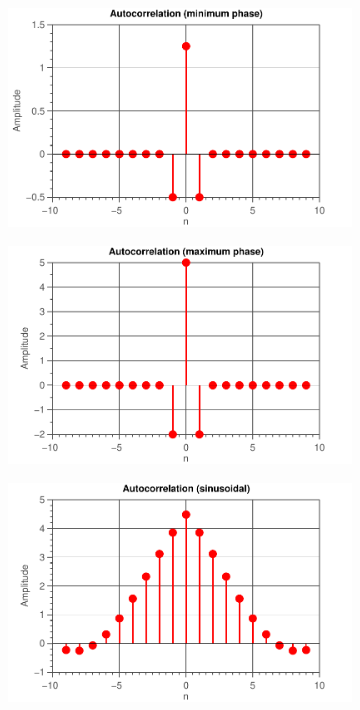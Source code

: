 \documentclass[11pt,titlepage]{report}
\begin{document}
\begin{figure}[H]
	\centering
	\begin{subfigure}{0.49\textwidth}
		\includegraphics[width=\textwidth]{../../deliverable-7-resources/figures/ass-1/report-8-9-10/report-8/ass-1-report-8-minimum-phase-minimum-phase.pdf}
	\end{subfigure}
	\begin{subfigure}{0.49\textwidth}
		\includegraphics[width=\textwidth]{../../deliverable-7-resources/figures/ass-1/report-8-9-10/report-8/ass-1-report-8-maximum-phase-maximum-phase.pdf}
	\end{subfigure}
	\begin{subfigure}{0.49\textwidth}
		\includegraphics[width=\textwidth]{../../deliverable-7-resources/figures/ass-1/report-8-9-10/report-8/ass-1-report-8-sinusoidal-sinusoidal.pdf}

\end{subfigure}
\end{figure}
\end{document}
